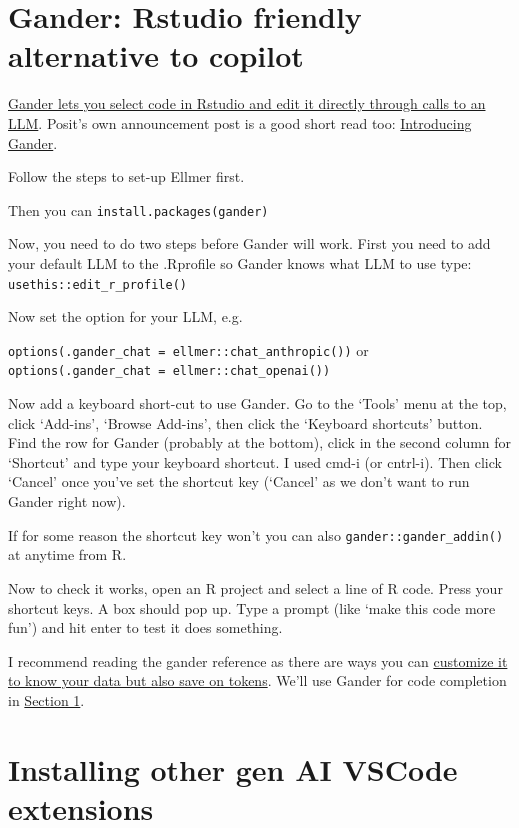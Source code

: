 \documentclass[
  letterpaper,
  DIV=11,
  numbers=noendperiod]{scrreprt}
\begin{document}
\section{Gander: Rstudio friendly alternative to
copilot}\label{sec-gander}

\href{https://simonpcouch.github.io/gander/articles/gander.html}{Gander
lets you select code in Rstudio and edit it directly through calls to an
LLM}. Posit's own announcement post is a good short read too:
\href{https://posit.co/blog/introducing-gander/}{Introducing Gander}.

Follow the steps to set-up Ellmer first.

Then you can \texttt{install.packages(gander)}

Now, you need to do two steps before Gander will work. First you need to
add your default LLM to the .Rprofile so Gander knows what LLM to use
type: \texttt{usethis::edit\_r\_profile()}

Now set the option for your LLM, e.g.

\texttt{options(.gander\_chat\ =\ ellmer::chat\_anthropic())} or
\texttt{options(.gander\_chat\ =\ ellmer::chat\_openai())}

Now add a keyboard short-cut to use Gander. Go to the `Tools' menu at
the top, click `Add-ins', `Browse Add-ins', then click the `Keyboard
shortcuts' button. Find the row for Gander (probably at the bottom),
click in the second column for `Shortcut' and type your keyboard
shortcut. I used cmd-i (or cntrl-i). Then click `Cancel' once you've set
the shortcut key (`Cancel' as we don't want to run Gander right now).

If for some reason the shortcut key won't you can also
\texttt{gander::gander\_addin()} at anytime from R.

Now to check it works, open an R project and select a line of R code.
Press your shortcut keys. A box should pop up. Type a prompt (like `make
this code more fun') and hit enter to test it does something.

I recommend reading the gander reference as there are ways you can
\href{https://simonpcouch.github.io/gander/articles/gander.html}{customize
it to know your data but also save on tokens}. We'll use Gander for code
completion in \href{section-1-line-by-line/04-gander.qmd}{Section 1}.

\section{Installing other gen AI VSCode
extensions}\label{sec-otheroptions}
\end{document}

